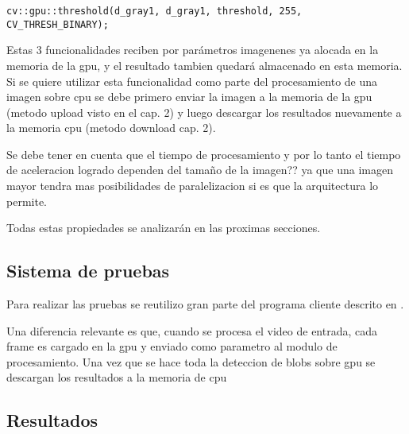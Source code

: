 \documentclass[a4paper,10pt]{report}
\begin{document}


 \begin{lstlisting}[columns=flexible,basicstyle=\ttfamily\small\bfseries]
cv::gpu::threshold(d_gray1, d_gray1, threshold, 255, CV_THRESH_BINARY);
\end{lstlisting}


 
 
 Estas 3 funcionalidades reciben por parámetros imagenenes ya alocada en la memoria de la gpu, y el resultado tambien quedará almacenado en esta memoria.
Si se quiere utilizar esta funcionalidad como parte del procesamiento de una imagen sobre cpu se debe primero enviar la imagen a la memoria de la gpu (metodo upload visto en el cap. 2)
y luego descargar los resultados nuevamente a la memoria cpu (metodo download cap. 2).
 
 Se debe tener en cuenta que el tiempo de procesamiento y por lo tanto el tiempo de aceleracion logrado dependen del tamaño de la imagen?? 
 ya que una imagen mayor tendra mas posibilidades de paralelizacion si es que la arquitectura lo permite.

 Todas estas propiedades se analizarán en las proximas secciones.
 
\subsection{Sistema de pruebas}
Para realizar las pruebas se reutilizo gran parte del programa cliente descrito en \cite[capitulo 4]{Jaureguiberry}.

Una diferencia relevante es que, cuando se procesa el video de entrada, cada frame es cargado en la gpu y enviado como parametro al modulo de procesamiento. 
Una vez que se hace toda la deteccion de blobs sobre gpu se descargan los resultados a la memoria de cpu

\subsection{Resultados}
\end{document}
